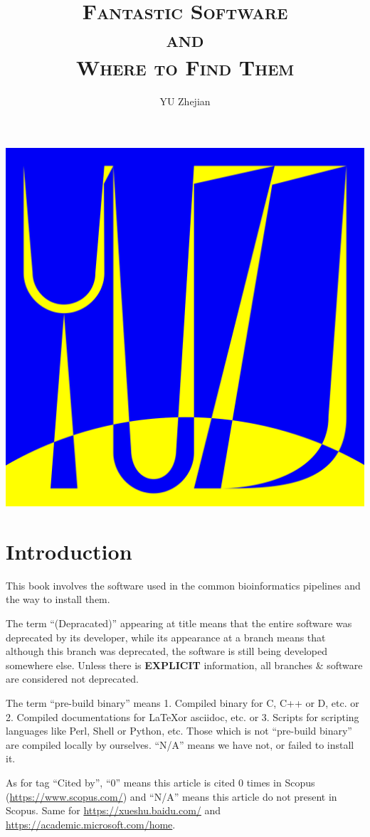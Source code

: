 \documentclass[]{article}
\newcommand{\de}{{\color{red}(Depracated)}}
\begin{document}
\title{\fontsize{40}{40}\selectfont\scshape Fantastic Software\\{\Huge and}\\Where to Find Them}
\author{YU Zhejian}
\maketitle
\setcounter{section}{-1}
\begin{center}
\includegraphics[width=0.5\linewidth]{YuZJLab_BG.png}
\end{center}
\section{Introduction}

This book involves the software used in the common bioinformatics pipelines and the way to install them.

The term ``\de'' appearing at title means that the entire software was deprecated by its developer, while its appearance at a branch means that although this branch was deprecated, the software is still being developed somewhere else. Unless there is \textbf{EXPLICIT} information, all branches \& software are considered not deprecated.

The term ``pre-build binary'' means 1. Compiled binary for C, C++ or D, etc. or 2. Compiled documentations for \LaTeX or asciidoc, etc. or 3. Scripts for scripting languages like Perl, Shell or Python, etc. Those which is not ``pre-build binary'' are compiled locally by ourselves. ``N/A'' means we have not, or failed to install it.

As for tag ``Cited by'', ``0'' means this article is cited 0 times in Scopus (\url{https://www.scopus.com/}) and ``N/A'' means this article do not present in Scopus. Same for \url{https://xueshu.baidu.com/} and \url{https://academic.microsoft.com/home}.
\end{document}

